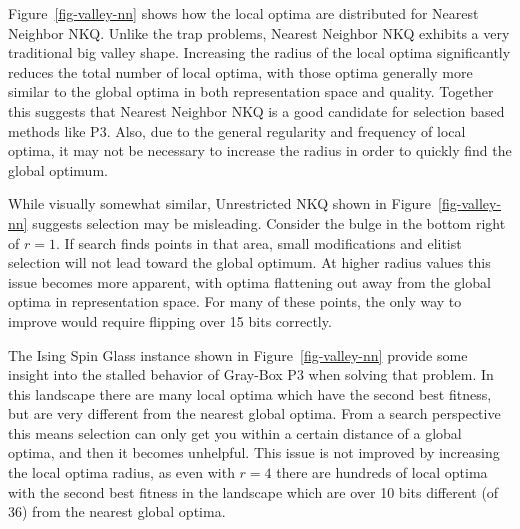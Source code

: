 \begin{figure*}
  \centering
  \caption{Location and quality of local optima in comparison to the global optima for a representative Nearest Neighbor NKQ problem
           with $N=60$ and $k=2$.}
  \label{fig-valley-nn}
\end{figure*}

Figure~\ref{fig-valley-nn} shows how the local optima are distributed for Nearest Neighbor NKQ. Unlike the trap problems,
Nearest Neighbor NKQ exhibits a very traditional big valley shape. Increasing the radius of the local optima significantly
reduces the total number of local optima, with those optima generally more similar to the global optima in both representation
space and quality. Together this suggests that Nearest Neighbor NKQ is a good candidate for selection based methods like P3. Also,
due to the general regularity and frequency of local optima, it may not be necessary to increase the radius in order to quickly find
the global optimum.

\begin{figure*}
  \centering
  \caption{Location and quality of local optima in comparison to the global optima for a representative Unrestricted NKQ problem
           with $N=60$ and $k=2$.}
  \label{fig-valley-un}
\end{figure*}

While visually somewhat similar, Unrestricted NKQ shown in Figure~\ref{fig-valley-nn} suggests selection may be misleading.
Consider the bulge in the bottom right of $r=1$. If search finds points in that area, small modifications and elitist selection
will not lead toward the global optimum. At higher radius values this issue becomes more apparent, with optima flattening out away
from the global optima in representation space. For many of these points, the only way to improve would require flipping over 15 bits
correctly.

\begin{figure*}
  \centering
  \caption{Location and quality of local optima in comparison to the global optima for a representative Ising Spin Glass problem
           with $N=36$.}
  \label{fig-valley-is}
\end{figure*}

The Ising Spin Glass instance shown in Figure~\ref{fig-valley-nn} provide some insight into the stalled behavior of Gray-Box
P3 when solving that problem. In this landscape there are many local optima which have the second best fitness, but are very
different from the nearest global optima. From a search perspective this means selection can only get you within a certain distance
of a global optima, and then it becomes unhelpful. This issue is not improved by increasing the local optima radius, as even with
$r=4$ there are hundreds of local optima with the second best fitness in the landscape which are over 10 bits different (of 36) from
the nearest global optima.

